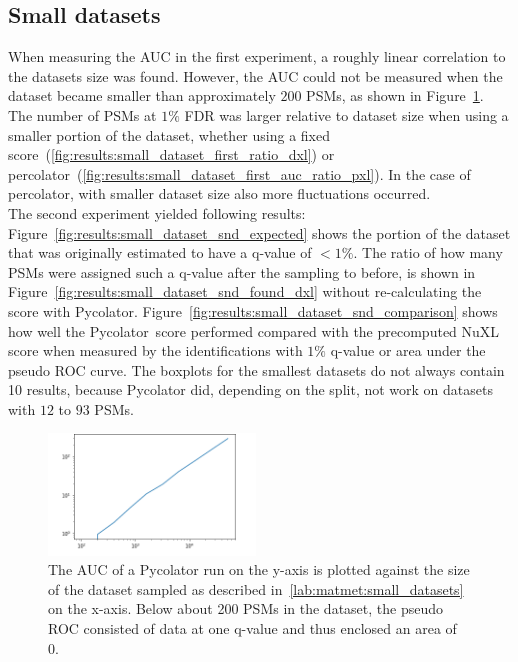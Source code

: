 \subsection{Small datasets}
\label{lab:results:small_datasets}
When measuring the AUC in the first experiment, a roughly linear correlation to the datasets size was found. However, the AUC could not be measured when the dataset became smaller than approximately $200$ PSMs, as shown in Figure~\ref{fig:results:small_dataset_first_auc}. The number of PSMs at $1\%$ FDR was larger relative to dataset size when using a smaller portion of the dataset, whether using a fixed score~(\ref{fig:results:small_dataset_first_ratio_dxl}) or percolator~(\ref{fig:results:small_dataset_first_auc_ratio_pxl}). In the case of percolator, with smaller dataset size also more fluctuations occurred.\\
The second experiment yielded following results: Figure~\ref{fig:results:small_dataset_snd_expected} shows the portion of the dataset that was originally estimated to have a q-value of $<1\%$. The ratio of how many PSMs were assigned such a q-value after the sampling to before, is shown in Figure~\ref{fig:results:small_dataset_snd_found_dxl} without re-calculating the score with Pycolator. Figure~\ref{fig:results:small_dataset_snd_comparison} shows how well the Pycolator~score performed compared with the precomputed NuXL score when measured by the identifications with $1\%$ q-value or area under the pseudo ROC curve. The boxplots for the smallest datasets do not always contain 10 results, because Pycolator did, depending on the split, not work on datasets with $12$ to $93$ PSMs.\\
\renewcommand{\baselinestretch}{0.9}
\begin{figure}
	\normalsize
	\centering
	\includegraphics[width = 0.49\textwidth]{figures/aucs_perc.png}
	\caption[Correlation between AUC and dataset size]{The AUC of a Pycolator run on the y-axis is plotted against the size of the dataset sampled as described in~\ref{lab:matmet:small_datasets} on the x-axis. Below about 200 PSMs in the dataset, the pseudo ROC consisted of data at one q-value and thus enclosed an area of 0.}
	\label{fig:results:small_dataset_first_auc}
\end{figure}

